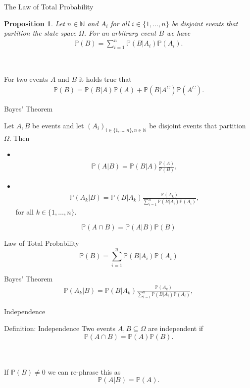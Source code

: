 \documentclass[11pt,pdf,ngerman,UKenglish]{beamer}%
\newcommand{\IN}{\mathds{N}}
\newcommand{\IP}{\mathbb{P}}
\newcommand{\1}{\mathbb{1}}
\theoremstyle{thm}
\newtheorem{proposition}[theorem]{Proposition}
\theoremstyle{def}
\begin{document}
\begin{frame}{The Law of Total Probability}
\begin{proposition}
Let $n\in \IN$ and $A_i$ for all $i \in \{1,\ldots,n\}$ be disjoint events that partition the state space $\Omega$. For an arbitrary event $B$ we have
\begin{align*}
\IP(B)
= \sum_{i=1}^n \IP(B \vert A_i ) \IP(A_i)
.
\end{align*}
\end{proposition}
\
\begin{corollary}
For two events $A$ and $B$ it holds true that
\begin{align*}
\IP(B) = \IP(B \vert A) \IP(A) + \IP(B \vert A^C) \IP(A^C)
.
\end{align*}
\end{corollary}
\end{frame}


\begin{frame}{Bayes' Theorem}
\begin{theorem}
Let $A,B$ be events and let $(A_i)_{i\in\{1,\ldots,n\}, n \in \IN}$ be disjoint events that partition $\Omega$. Then
\begin{itemize}
\item \ \vspace*{-7mm}
\begin{align*}
\IP(A \vert B) = \IP(B \vert A ) \frac{\IP(A)}{\IP(B)},
\end{align*}
\item \ \vspace*{-7mm}
\begin{align*}
\IP(A_k \vert B) = \IP(B \vert A_k ) \frac{\IP(A_k)}{\sum_{i=1}^n \IP(B \vert A_i) \IP(A_i)},
\end{align*}
for all $k \in \{1,\ldots,n\}$.
\end{itemize}
\end{theorem}
\end{frame}


\begin{frame}
\begin{block}{}
$$\IP(A \cap B) = \IP(A \vert B) \IP(B)$$
\end{block}
\begin{block}{Law of Total Probability}
$$\IP(B)
= \sum_{i=1}^n \IP(B \vert A_i ) \IP(A_i)$$
\end{block}
\begin{block}{Bayes' Theorem}
\begin{align*}
\IP(A_k \vert B) = \IP(B \vert A_k ) \frac{\IP(A_k)}{\sum_{i=1}^n \IP(B \vert A_i) \IP(A_i)},
\end{align*}
\end{block}
\end{frame}


\begin{frame}{Independence}
\begin{block}{Definition: Independence}
Two events $A,B \subseteq \Omega$ are independent if
$$ \IP(A \cap B) = \IP(A) \IP(B).$$
\end{block}

\ \\ \ \\
If $\IP(B) \neq 0$ we can re-phrase this as
$$ \IP(A \vert B) = \IP(A).$$
\end{frame}



%
\end{document}
